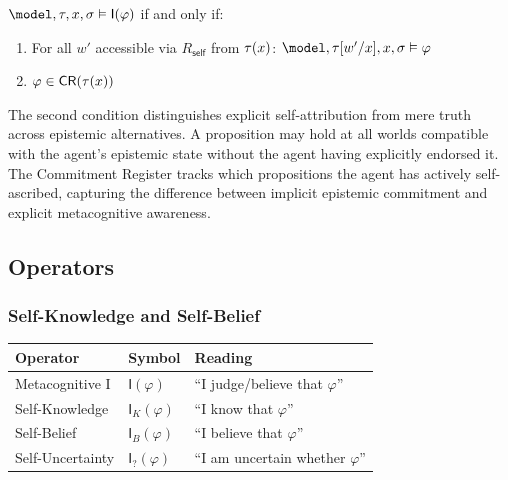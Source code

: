 \documentclass[../LogosReference.tex]{subfiles}
\begin{document}
\begin{definition}\label{def:reflection-truth}
$\model, \history, x, \assignment \vDash \mathsf{I}(\varphi)$ if and only if:
\begin{enumerate}
  \item For all $w'$ accessible via $R_{\mathsf{self}}$ from $\tau(x)$:
        $\model, \history[w'/x], x, \assignment \vDash \varphi$
  \item $\varphi \in \mathsf{CR}(\tau(x))$
\end{enumerate}
\end{definition}

\begin{remark}
The second condition distinguishes explicit self-attribution from mere truth across epistemic alternatives.
A proposition may hold at all worlds compatible with the agent's epistemic state without the agent having explicitly endorsed it.
The Commitment Register tracks which propositions the agent has actively self-ascribed,
capturing the difference between implicit epistemic commitment and explicit metacognitive awareness.
\end{remark}


\subsection{Operators}\label{sec:reflection-operators}

\subsubsection{Self-Knowledge and Self-Belief}

\begin{center}
\begin{tabular}{lll}
\toprule
\textbf{Operator} & \textbf{Symbol} & \textbf{Reading} \\
\midrule
Metacognitive I & $\mathsf{I}(\varphi)$ & ``I judge/believe that $\varphi$'' \\
Self-Knowledge & $\mathsf{I}_K(\varphi)$ & ``I know that $\varphi$'' \\
Self-Belief & $\mathsf{I}_B(\varphi)$ & ``I believe that $\varphi$'' \\
Self-Uncertainty & $\mathsf{I}_?(\varphi)$ & ``I am uncertain whether $\varphi$'' \\
\bottomrule
\end{tabular}
\end{center}
\end{document}
